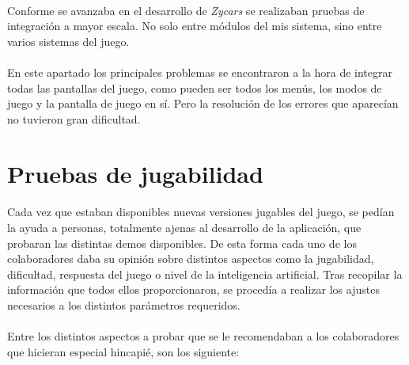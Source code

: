 \paragraph{}
Conforme se avanzaba en el desarrollo de \emph{Zycars} se realizaban pruebas de integración a mayor escala. No solo entre módulos
del mis sistema, sino entre varios sistemas del juego.

\paragraph{}
En este apartado los principales problemas se encontraron a la hora de integrar todas las pantallas del juego, como pueden ser todos
los menús, los modos de juego y la pantalla de juego en sí. Pero la resolución
de los errores que aparecían no tuvieron gran 
dificultad.

\section{Pruebas de jugabilidad}

\paragraph{}
Cada vez que estaban disponibles nuevas versiones jugables del juego, se pedían la ayuda a personas, totalmente ajenas al desarrollo
de la aplicación, que probaran las distintas demos disponibles. De esta forma cada uno de los colaboradores daba su opinión sobre
distintos aspectos como la jugabilidad, dificultad, respuesta del juego o nivel de la inteligencia artificial. Tras recopilar la
información que todos ellos proporcionaron, se procedía a realizar los ajustes
necesarios a los distintos parámetros requeridos.

\paragraph{}
Entre los distintos aspectos a probar que se le recomendaban a los
colaboradores que hicieran especial hincapié, son los siguiente:

